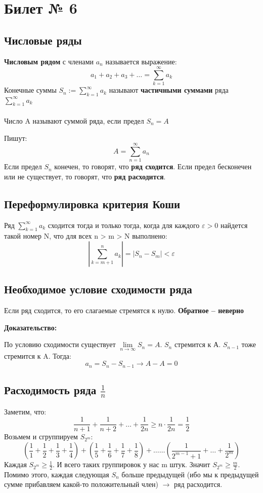 \documentclass[a4paper,12pt]{article}
\begin{document}
\section*{Билет № 6}
\subsection*{Числовые ряды}
\textbf{Числовым рядом} с членами $a_n$ называется выражение:
\[
a_1 + a_2 + a_3 + \ldots = \sum_{k=1}^{\infty}a_k
\]
Конечные суммы $S_n :=\sum\limits_{k=1}^{\infty}a_k$ называют \textbf{частичными суммами} ряда
$\sum\limits_{k=1}^{\infty}a_k$
\\\\
Число A называют суммой ряда, если предел $S_n = A$

Пишут:
\[
A = \sum_{n=1}^{\infty} a_n
\]
Если предел $S_n$ конечен, то говорят, что \textbf{ряд сходится}. Если предел бесконечен или не существует, то говорят, что \textbf{ряд расходится}.
\subsection*{Переформулировка критерия Коши}
Ряд $\sum\limits_{k=1}^{\infty}a_k$ сходится тогда и только тогда, когда для каждого $\varepsilon> 0 $ найдется такой номер N, что для всех n > m > N выполнено:
\[
\left| \sum_{k=m+1}^{n} a_k\right| = |S_n - S_m| < \varepsilon
\]
\subsection*{Необходимое условие сходимости ряда}
Если ряд сходится, то его слагаемые стремятся к нулю. \textbf{Обратное -- неверно}

\textbf{Доказательство:}

По условию сходимости существует $\lim\limits_{n\rightarrow\infty}S_n =  A$.
$S_n$ стремится к А. $S_{n-1}$ тоже стремится к A. Тогда:
\[
a_n = S_n - S_{n-1} \rightarrow A - A  = 0
\]
\subsection*{Расходимость ряда $\frac{1}{n}$}
Заметим, что:
\[
\frac{1}{n+1} + \frac{1}{n+2} + \ldots + \frac{1}{2n} \geq n \cdot \frac{1}{2n} = \frac{1}{2}
\]
Возьмем и сгруппируем $S_{2^m} $:
\[
(\frac{1}{1} + \frac{1}{2} + \frac{1}{3} + \frac{1}{4}) + (\frac{1}{5} + \frac{1}{6} + \frac{1}{7} + \frac{1}{8}) + \ldots \ldots (\frac{1}{2^{m-1}+1} + \ldots + \frac{1}{2^m})
\]
Каждая $S_{2^m} \geq \frac{1}{2}$. И всего таких группировок у нас m штук. Значит $S_{2^m} \geq \frac{m}{2}$. Помимо этого, каждая следующая $S_n$ больше предыдущей (ибо мы к предыдущей сумме прибавляем какой-то положительный член) $\rightarrow$ ряд расходится.
\end{document}
